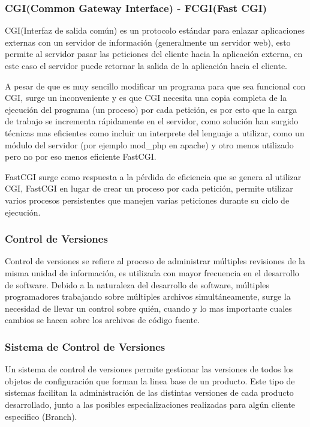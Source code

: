 \subsubsection*{CGI(Common Gateway Interface) - FCGI(Fast CGI)}

CGI(Interfaz de salida común) es un protocolo estándar para enlazar aplicaciones externas con un servidor de información (generalmente un servidor web), esto permite al servidor pasar las peticiones del cliente hacia la aplicación externa, en este caso el servidor puede retornar la salida de la aplicación hacia el cliente.

A pesar de que es muy sencillo modificar un programa para que sea funcional con CGI, surge un inconveniente y es que CGI necesita una copia completa de la ejecución del programa (un proceso) por cada petición, es por esto que la carga de trabajo se incrementa rápidamente en el servidor, como solución han surgido técnicas mas eficientes como incluir un interprete del lenguaje a utilizar, como un módulo del servidor (por ejemplo mod\_php en apache) y otro menos utilizado pero no por eso menos eficiente FastCGI.

FastCGI surge como respuesta a la pérdida de eficiencia que se genera al utilizar CGI, FastCGI en lugar de crear un proceso por cada petición, permite utilizar varios procesos persistentes que manejen varias peticiones durante su ciclo de ejecución.


\subsubsection*{Control de Versiones}

Control de versiones se refiere al proceso de administrar múltiples revisiones de la misma unidad de información, es utilizada con mayor frecuencia en el desarrollo de software.
Debido a la naturaleza del desarrollo de software, múltiples programadores trabajando sobre múltiples archivos simultáneamente, surge la necesidad de llevar un control sobre quién, cuando y lo mas importante cuales cambios se hacen sobre los archivos de código fuente.


\subsubsection*{Sistema de Control de Versiones}

Un sistema de control de versiones permite gestionar las versiones de todos los objetos de configuración que forman la linea base de un producto. Este tipo de sistemas facilitan la administración de las distintas versiones de cada producto desarrollado, junto a las posibles especializaciones realizadas para algún cliente especifico (Branch).


